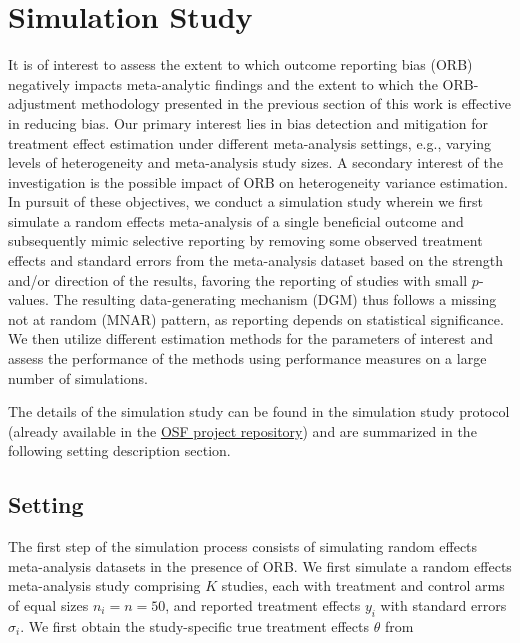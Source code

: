 \documentclass[twocolumn]{article}\usepackage[]{graphicx}\usepackage[]{xcolor}
\begin{document}
\section{Simulation Study} \label{simstudy}
It is of interest to assess the extent to which outcome reporting bias (ORB) negatively impacts meta-analytic findings and the extent to which the ORB-adjustment methodology presented in the previous section of this work is effective in reducing bias. Our primary interest lies in bias detection and mitigation for treatment effect estimation under different meta-analysis settings, e.g., varying levels of heterogeneity and meta-analysis study sizes. A secondary interest of the investigation is the possible impact of ORB on heterogeneity variance estimation. In pursuit of these objectives, we conduct a simulation study wherein we first simulate a random effects meta-analysis of a single beneficial outcome and subsequently mimic selective reporting by removing some observed treatment effects and standard errors from the meta-analysis dataset based on the strength and/or direction of the results, favoring the reporting of studies with small $p$-values. The resulting data-generating mechanism (DGM) thus follows a missing not at random (MNAR) pattern, as reporting depends on statistical significance. We then utilize different estimation methods for the parameters of interest and assess the performance of the methods using performance measures on a large number of simulations. 

The details of the simulation study can be found in the simulation study protocol (already available in the \href{https://osf.io/ancdu/}{OSF project repository}) and are summarized in the following setting description section.

\subsection{Setting} \label{3.1}

The first step of the simulation process consists of simulating random effects meta-analysis datasets in the presence of ORB. We first simulate a random effects meta-analysis study comprising $K$ studies, each with treatment and control arms of equal sizes $n_i = n = 50$, and reported treatment effects $y_i$ with standard errors $\sigma_i$. We first obtain the study-specific true treatment effects $\theta$ from
\end{document}
